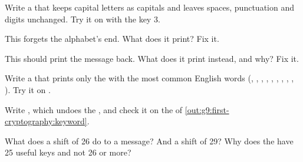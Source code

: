 \begin{exercise}[$\star$]\label{exo:g9:first-cryptography:4}
Write a  that keeps capital letters as capitals and leaves spaces,
punctuation and digits unchanged. Try it on 
with the key 3.
\end{exercise}

\begin{exercise}[$\star\star$]\label{exo:g9:first-cryptography:5}
This  forgets the alphabet's end. What does it print? Fix it.

\label{lst:g9:first-cryptography:shift-bug}
\end{exercise}

\begin{exercise}[$\star\star$]\label{exo:g9:first-cryptography:6}
This  should print the message back. What does it print instead, and
why? Fix it.

\label{lst:g9:first-cryptography:decrypt-bug}
\end{exercise}

\begin{exercise}[$\star\star$]\label{exo:g9:first-cryptography:7}
Write a  that prints only the  with the most common
English words (, , , , ,
, , , , ). Try it on
.
\end{exercise}

\begin{exercise}[$\star\star$]\label{exo:g9:first-cryptography:8}
Write , which undoes the ,
and check it on the  of \cref{out:g9:first-cryptography:keyword}.
\end{exercise}

\begin{exercise}[$\star\star$]\label{exo:g9:first-cryptography:9}
What does a shift of 26 do to a message? And a shift of 29? Why does the  have 25 useful keys and not 26 or more?
\end{exercise}

